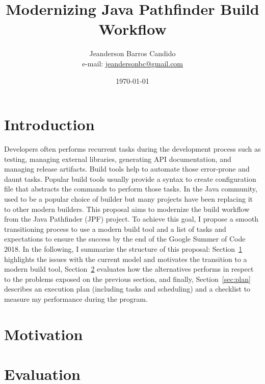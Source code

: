 \documentclass[a4paper]{article}
\author{Jeanderson Barros Candido\\e-mail: \url{jeandersonbc@gmail.com}}
\title{Modernizing Java Pathfinder Build Workflow}
\date{\today}
\begin{document}
\maketitle

\section*{Introduction}

Developers often performs recurrent tasks during the development process such
as testing, managing external libraries, generating API documentation, and
managing release artifacts.
Build tools help to automate those error-prone and daunt tasks.
Popular build tools usually provide a syntax to create configuration file
that abstracts the commands to perform those tasks.
In the Java community, \ant{} used to be a popular choice of builder but many
projects have been replacing it to other modern builders.
This proposal aims to modernize the build workflow from the Java Pathfinder
(JPF) project.
To achieve this goal, I propose a smooth transitioning process to use a modern
build tool and a list of tasks and expectations to ensure the success by the
end of the Google Summer of Code 2018.
In the following, I summarize the structure of this proposal:
Section~\ref{sec:motivation} highlights the issues with the current model and
motivates the transition to a modern build tool, Section~\ref{sec:evaluation}
evaluates how the alternatives performs in respect to the problems exposed on
the previous section, and finally, Section~\ref{sec:plan} describes an
execution plan (including tasks and scheduling) and a checklist to measure my
performance during the program.

\section{Motivation}
\label{sec:motivation}


\section{Evaluation}
\label{sec:evaluation}

\end{document}
